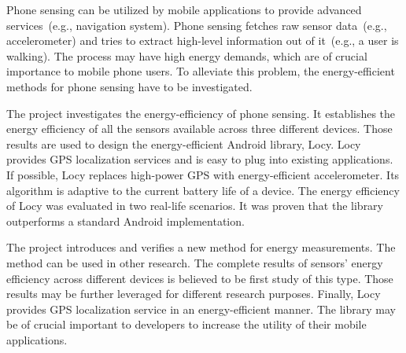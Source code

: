 Phone sensing can be utilized by mobile applications to provide advanced services\ (e.g., navigation system).  Phone sensing fetches raw sensor data\ (e.g., accelerometer) and tries to extract high-level information out of it\ (e.g., a user is walking). The process may have high energy demands, which are of crucial importance to mobile phone users. To alleviate this problem, the energy-efficient methods for phone sensing have to be investigated.  

The project investigates the energy-efficiency of phone sensing. It establishes the energy efficiency of all the sensors available across three different devices. Those results are used to design the energy-efficient Android library, Locy. Locy provides GPS localization services and is easy to plug into existing applications. If possible, Locy replaces high-power GPS with energy-efficient accelerometer. Its algorithm is adaptive to the current battery life of a device. The energy efficiency of Locy was evaluated in two real-life scenarios. It was proven that the library outperforms a standard Android implementation. 

The project introduces and verifies a new method for energy measurements. The method can be used in other research. The complete results of sensors' energy efficiency across different devices is believed to be first study of this type. Those results may be further leveraged for different research purposes. Finally, Locy provides GPS localization service in an energy-efficient manner. The library may be of crucial important to developers to increase the utility of their mobile applications.
	
	